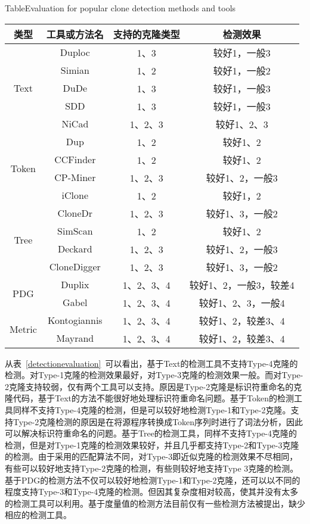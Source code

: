 \begin{table}[htbp]
{Table$\!$}{Evaluation for popular clone detection methods and tools}
\vspace{0.5em}
\centering
\wuhao
\begin{tabular}{cccc}
\toprule[1.5pt]
类型&工具或方法名&支持的克隆类型&检测效果\\
\midrule[1pt]
\multirow{5}{*}{Text} 
& Duploc\cite{ducasse1999language}&1、3&较好1，一般3\\
&Simian&1、2	&较好1，一般2\\
&DuDe\cite{wettel2005archeology}&1、3	&较好1，一般3\\
&SDD\cite{lee2005sdd}&1、3	&较好1，一般3\\
&NiCad\cite{roy2008nicad}&	1、2、3	&较好1、2、3\\
\hline
\multirow{4}{*}{Token} 
&Dup\cite{baker1995finding}&	1、2&较好1、2\\
&CCFinder\cite{kamiya2002ccfinder}&1、2&较好1、2\\
&CP-Miner\cite{li2006cp}&1、2、3&较好1、2，一般3\\
&iClone\cite{gode2009incremental}&1、2	&较好1，2\\
\hline
\multirow{4}{*}{Tree} 
&CloneDr\cite{baxter1998clone}&	1、2、3	&较好1、3，一般2\\
&SimScan&	1、2	&较好1、2\\
&Deckard\cite{jiang2007deckard}&	1、2、3	&较好1、2，一般3\\
&CloneDigger\cite{bulychev2008duplicate}&	1、2、3	&较好1、3，一般2\\
\hline
\multirow{2}{*}{PDG} 
&Duplix\cite{krinke2001identifying}&	1、2、3、4	&较好1、2，一般3，较差4\\
&Gabel\cite{gabel2008scalable}&1、2、3、4	&较好1、2、3，一般4\\
\hline
\multirow{2}{*}{Metric} 
&Kontogiannis\cite{kontogiannis1996pattern}&	1、2、3、4	&较好1、2，较差3、4\\
&Mayrand\cite{mayrand1996experiment}&	1、2、3、4	&较好1、2，较差3、4\\
\bottomrule[1.5pt]
\end{tabular}
\end{table}


从表~\ref{detectionevaluation}~可以看出，基于Text的检测工具不支持Type-4克隆的检测。对Type-1克隆的检测效果最好，对Type-3克隆的检测效果一般。而对Type-2克隆支持较弱，仅有两个工具可以支持。原因是Type-2克隆是标识符重命名的克隆代码，基于Text的方法不能很好地处理标识符重命名问题。基于Token的检测工具同样不支持Type-4克隆的检测，但是可以较好地检测Type-1和Type-2克隆。支持Type-2克隆检测的原因是在将源程序转换成Token序列时进行了词法分析，因此可以解决标识符重命名的问题。基于Tree的检测工具，同样不支持Type-4克隆的检测，但是对Type-1克隆的检测效果较好，并且几乎都支持Type-2和Type-3克隆的检测。由于采用的匹配算法不同，对Type-3即近似克隆的检测效果不尽相同，有些可以较好地支持Type-2克隆的检测，有些则较好地支持Type 3克隆的检测。基于PDG的检测方法不仅可以较好地检测Type-1和Type-2克隆，还可以以不同的程度支持Type-3和Type-4克隆的检测。但因其复杂度相对较高，使其并没有太多的检测工具可以利用。基于度量值的检测方法目前仅有一些检测方法被提出\cite{kontogiannis1996pattern,mayrand1996experiment}，缺少相应的检测工具。

